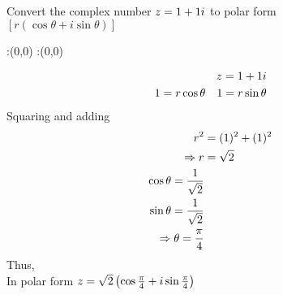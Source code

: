



\question Convert the complex number $z =1+1 i$ to polar form \\ $\left[ r(\cos \theta + i \sin \theta) \right] $ 


\watchout

\ifprintanswers
  \begin{marginfigure}
      :(0,0)
      :(0,0)
    \figdrawbegin{}
      \figdrawline [100,101]
    \figdrawend
    \figvisu{\figBoxA}{}{%
    }
    \centerline{\box\figBoxA}
  \end{marginfigure}
\fi 

\begin{solution}
\begin{align}
z = 1 + 1 i \\
1 = r \cos \theta  \quad 1 = r \sin \theta 
\end{align}
Squaring and adding
\begin{align}
r^{2} &= (1)^{2} + (1)^{2}  \\
\Rightarrow r &= \sqrt{2} \\
\cos \theta = \dfrac{1}{\sqrt{2}} \\ 
\sin \theta = \dfrac{1}{\sqrt{2}} \\
\Rightarrow \theta = \frac{\pi}{4} 
\end{align} 
Thus, \\
In polar form $z = \sqrt{2} \left( \cos \frac{\pi}{4} + i \sin \frac{\pi}{4} \right)$ 
\end{solution}


